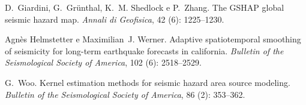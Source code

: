 \documentclass[final]{beamer}
\begin{document}
\begin{poster}
D.~Giardini, G.~Gr{\"u}nthal, K.~M. Shedlock e P.~Zhang.
The {GSHAP} global seismic hazard map.
\emph{Annali di Geofisica}, 42 (6): 1225--1230.

Agn{\`e}s Helmstetter e Maximilian~J. Werner.
Adaptive spatiotemporal smoothing of seismicity for long-term
  earthquake forecasts in california.
\emph{Bulletin of the Seismological Society of America}, 102
  (6): 2518--2529.

G.~Woo.
Kernel estimation methods for seismic hazard area source modeling.
\emph{Bulletin of the Seismological Society of America}, 86
  (2): 353--362.

\end{poster}
\end{document}

